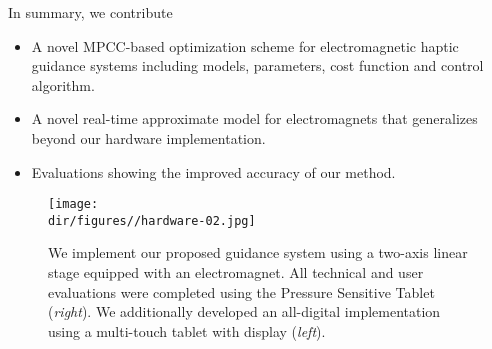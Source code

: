 In summary, we contribute
\begin{itemize}
\setlength\itemsep{0em}
\item A novel MPCC-based optimization scheme for electromagnetic haptic guidance systems including models, parameters, cost function and control algorithm.
\item A novel real-time approximate model for electromagnets that generalizes beyond our hardware implementation.
\item Evaluations showing the improved accuracy of our method.
\end{itemize}
\begin{figure}[!t]
\texttt{[image: \\dir/figures//hardware-02.jpg]}
\caption{We implement our proposed guidance system using a two-axis linear stage equipped with an electromagnet. All technical and user evaluations were completed using the Pressure Sensitive Tablet (\textit{right}). We additionally developed an all-digital implementation using a multi-touch tablet with display (\textit{left}).}
\label{fig:hardware}
\end{figure}